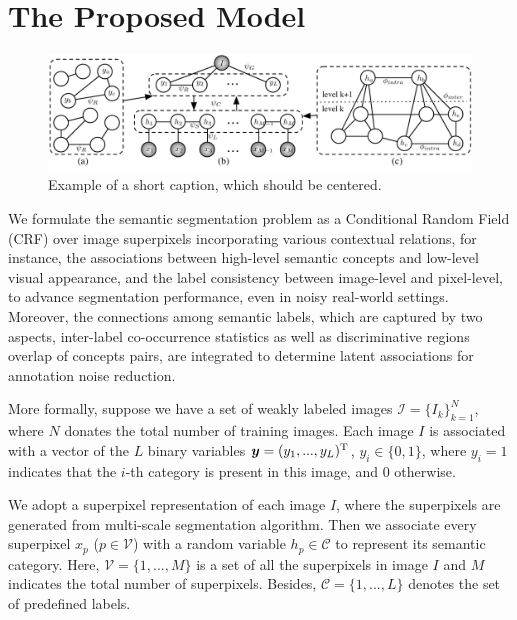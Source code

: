 
\section{The Proposed Model}

\begin{figure}[htb]
    \begin{center}
        \includegraphics[width=0.9\linewidth]{graphmodel.pdf}
    \end{center}
    \vspace{-3mm}
    \caption{Example of a short caption, which should be centered.}
    \vspace{-3mm}
    \label{fig:graphmodel}
\end{figure}

We formulate the semantic segmentation problem as a Conditional Random Field (CRF) over image superpixels incorporating various contextual relations, for instance, the associations between high-level semantic concepts and low-level visual appearance, and the label consistency between image-level and pixel-level, to advance segmentation performance, even in noisy real-world settings. Moreover, the connections among semantic labels, which are captured by two aspects, inter-label co-occurrence statistics as well as discriminative regions overlap of concepts pairs, are integrated to determine latent associations for annotation noise reduction.

More formally, suppose we have a set of weakly labeled images $\mathcal{I}=\{I_k\}_{k=1}^N$, where $N$ donates the total number of training images. Each image $I$ is associated with a vector of the $L$ binary variables $\boldsymbol{y} = (y_1,...,y_L)^{\rm T}$, \ie $y_i \in \{0,1\}$, where $y_i=1$ indicates that the $i$-th category is present in this image, and $0$ otherwise.

We adopt a superpixel representation of each image $I$, where the superpixels are generated from multi-scale segmentation algorithm. Then we associate every superpixel $x_p$ ($p \in \mathcal{V}$) with a random variable $h_p \in \mathcal{C}$ to represent its semantic category. Here, $\mathcal{V} = \{1,...,M\}$ is a set of all the superpixels in image $I$ and $M$ indicates the total number of superpixels. Besides, $\mathcal{C} = \{1,...,L\}$ denotes the set of predefined labels.

